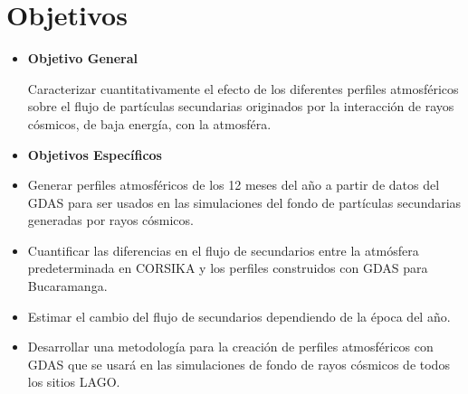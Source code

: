 \documentclass[11pt]{article}
\begin{document}



\section{Objetivos}


\begin{itemize}
\item \textbf{Objetivo General}

Caracterizar cuantitativamente el efecto de los diferentes perfiles atmosféricos sobre el flujo de partículas secundarias originados por la interacción de rayos cósmicos, de baja energía, con la atmosféra.


\item \textbf{Objetivos Espec\'ificos}
\end{itemize}

\begin{itemize}

\item Generar perfiles atmosféricos de los 12 meses del a\~no a partir de datos del GDAS para ser usados en las simulaciones del fondo de partículas secundarias generadas por rayos cósmicos.

\item Cuantificar las diferencias en el flujo de secundarios entre la atmósfera predeterminada en CORSIKA y los perfiles construidos con GDAS para Bucaramanga.

\item Estimar el cambio del flujo de secundarios dependiendo de la época del año.

\item Desarrollar una metodología para la creación de perfiles atmosféricos con GDAS que se usará en las simulaciones
de fondo de rayos cósmicos de todos los sitios LAGO.

\end{itemize}




\newpage

\end{document}
